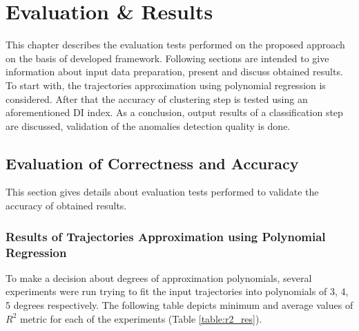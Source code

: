 \chapter{Evaluation \& Results}
\label{ch:Evaluation and Results}

This chapter describes the evaluation tests performed on the proposed approach on the basis of developed framework. Following sections are intended to give information about input data preparation, present and discuss obtained results. To start with, the trajectories approximation using polynomial regression is considered. After that the accuracy of clustering step is tested using an aforementioned DI index. As a conclusion, output results of a classification step are discussed, validation of the anomalies detection quality is done.

\section{Evaluation of Correctness and Accuracy}

This section gives details about evaluation tests performed to validate the accuracy of obtained results.

\subsection{Results of Trajectories Approximation using Polynomial Regression}

To make a decision about degrees of approximation polynomials, several experiments were run trying to fit the input trajectories into polynomials of 3, 4, 5 degrees respectively. The following table depicts minimum and average values of $R^2$ metric for each of the experiments (Table \ref{table:r2_res}). 

